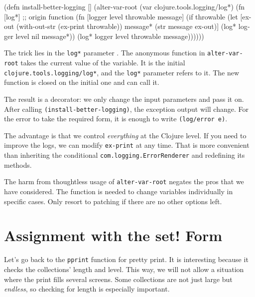 \else

\begin{english}
  \begin{clojure/lines}
(defn install-better-logging []
  (alter-var-root
   (var clojure.tools.logging/log*)
   (fn [log*] ;; origin function
     (fn [logger level throwable message]
       (if throwable
         (let [ex-out (with-out-str (ex-print throwable))
               message* (str message \newline ex-out)]
           (log* logger level nil message*))
         (log* logger level throwable message))))))
  \end{clojure/lines}
\end{english}

\fi

\mnoindent
The trick lies in the \verb|log*| parameter . The anonymous function in \verb|alter-var-root| takes the current value of the variable. It is the initial \verb|clojure.tools.logging/log*|, and the \verb|log*| parameter refers to it.
The new function is closed on the initial one and can call it.

The result is a decorator: we only change the input parameters and pass it on. After calling \verb|(install-better-logging)|, the exception output will change.
For the error to take the required form, it is enough to write \verb|(log/error e)|.

The advantage is that we control \emph{everything} at the Clojure level.
If you need to improve the logs, we can modify \verb|ex-print| at any time.
That is more convenient than inheriting the conditional \verb|com.logging.ErrorRenderer| and redefining its methods.

The harm from thoughtless usage of \verb|alter-var-root| negates the pros that we have considered.
The function is needed to change variables individually in specific cases.
Only resort to patching if there are no other options left.

\section{Assignment with the set! Form}


Let's go back to the \verb|pprint| function for pretty print. It is interesting because it checks the collections' length and level.
This way, we will not allow a situation where the print fills several screens.
Some collections are not just large but \emph{endless}, so checking for length is especially important.

